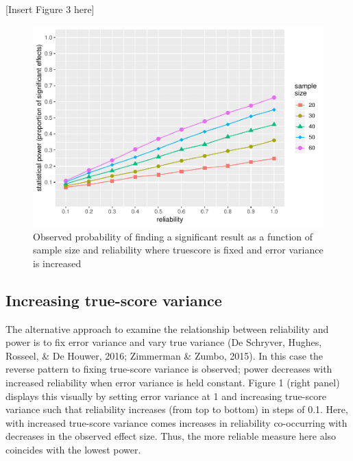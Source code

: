 \documentclass[english,,man]{apa6}
\begin{document}
\begin{center}
  
  [Insert Figure 3 here]
  
  \end{center}

\begin{figure}[H]
\includegraphics{visualising_reliability_and_power_relationships_v2_files/figure-latex/plotting3-1} \caption{Observed probability of finding a significant result as a function of sample size and reliability where truescore is fixed and error variance is increased}\label{fig:plotting3}
\end{figure}

\hypertarget{increasing-true-score-variance}{%
\subsection{Increasing true-score variance}\label{increasing-true-score-variance}}

The alternative approach to examine the relationship between reliability and power is to fix error variance and vary true variance (De Schryver, Hughes, Rosseel, \& De Houwer, 2016; Zimmerman \& Zumbo, 2015). In this case the reverse pattern to fixing true-score variance is observed; power decreases with increased reliability when error variance is held constant. Figure 1 (right panel) displays this visually by setting error variance at 1 and increasing true-score variance such that reliability increases (from top to bottom) in steps of 0.1. Here, with increased true-score variance comes increases in reliability co-occurring with decreases in the observed effect size. Thus, the more reliable measure here also coincides with the lowest power.
\end{document}
